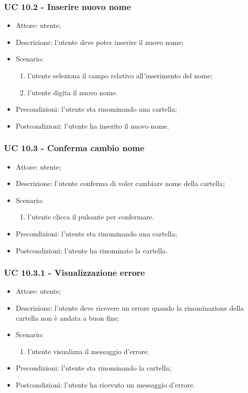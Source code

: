     \subsubsection{UC 10.2 - Inserire nuovo nome}
    \begin{itemize}
        \item Attore: utente;
        \item Descrizione: l'utente deve poter inserire il nuovo nome;
        \item Scenario:
        \begin{enumerate}
        \item l'utente seleziona il campo relativo all'inserimento del nome;
        \item l'utente digita il nuovo nome.
        \end{enumerate}
        \item Precondizioni: l'utente sta rinominando una cartella;
        \item Postcondizioni: l'utente ha inserito il nuovo nome.
    \end{itemize}
    \subsubsection{UC 10.3 - Conferma cambio nome}
    \begin{itemize}
        \item Attore: utente;
        \item Descrizione: l'utente conferma di voler cambiare nome della cartella;
        \item Scenario:
        \begin{enumerate}
        \item l'utente clicca il pulsante per confermare.
        \end{enumerate}
        \item Precondizioni: l'utente sta rinominando una cartella;
        \item Postcondizioni: l'utente ha rinominato la cartella.
    \end{itemize}
    \subsubsection{UC 10.3.1 - Visualizzazione errore }
    \begin{itemize}
        \item Attore: utente;
        \item Descrizione: l'utente deve ricevere un errore quando la rinominazione della cartella non è andata a buon fine;
        \item Scenario:
        \begin{enumerate}
        \item l'utente visualizza il messaggio d'errore.
        \end{enumerate}   
        \item Precondizioni: l'utente sta rinominando la cartella;
        \item Postcondizioni: l'utente ha ricevuto un messaggio d'errore.
    \end{itemize}

